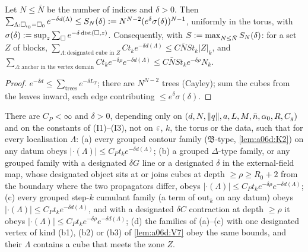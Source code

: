 \begin{lemma}\label{lem:a06d:V11}
Let $N\le\bar N$ be the number of indices and $\delta>0$. Then $\sum_{\Lambda:\square_{\iota_0}=\square_0}e^{-\delta d(\Lambda)}\le S_N(\delta):= N^{N-2}(e^\delta\sigma(\delta))^{N-1}$, uniformly in the torus, with $\sigma(\delta):=\sup_z\sum_\square e^{-\delta\operatorname{dist}(\square,z)}$. Consequently, with $S:=\max_{N\le\bar N}S_N(\delta)$: for a set $Z$ of blocks, $\sum_{\Lambda:\text{designated cube in }Z}Ct_ke^{-\delta d(\Lambda)}\le C\bar NSt_k|Z|_k$, and $\sum_{\Lambda:\text{anchor in the vertex domain}}Ct_ke^{-\delta\rho}e^{-\delta d(\Lambda)}\le C\bar NSt_ke^{-\delta\rho}N_k$.
\end{lemma}

\begin{proof}
$e^{-\delta d}\le\sum_{\text{trees}}e^{-\delta L_T}$; there are $N^{N-2}$ trees (Cayley); sum the cubes from the leaves inward, each edge contributing $\le e^\delta\sigma(\delta)$.
\end{proof}

\begin{lemma}\label{lem:a06d:V9}
There are $C_P<\infty$ and $\delta>0$, depending only on $(d,N,\lVert q\rVert,a,L,M,\bar n,\alpha_0,R,C_g)$ and on the constants of (I1)--(I3), not on $\varepsilon$, $k$, the torus or the data, such that for every localisation $\Lambda$: \textup{(a)} every grouped contour family ($\mathfrak B$-type, \cref{lem:a06d:K2}) on any datum obeys $|\cdot(\Lambda)|\le C_Pt_ke^{-\delta d(\Lambda)}$; \textup{(b)} a grouped $\Delta$-type family, or any grouped family with a designated $\delta G$ line or a designated $\delta$ in the external-field map, whose designated object sits at or joins cubes at depth $\ge\rho\ge R_0+2$ from the boundary where the two propagators differ, obeys $|\cdot(\Lambda)|\le C_Pt_ke^{-\delta\rho}e^{-\delta d(\Lambda)}$; \textup{(c)} every grouped step-$k$ cumulant family (a term of $\mathrm{out}_k$ on any datum) obeys $|\cdot(\Lambda)|\le C_Pt_ke^{-\delta d(\Lambda)}$, and with a designated $\delta C$ contraction at depth $\ge\rho$ it obeys $|\cdot(\Lambda)|\le C_Pt_ke^{-\delta\rho}e^{-\delta d(\Lambda)}$; \textup{(d)} the families of (a)--(c) with one designated vertex of kind (b1), (b2) or (b3) of \cref{lem:a06d:V7} obey the same bounds, and their $\Lambda$ contains a cube that meets the zone $Z$.
\end{lemma}

